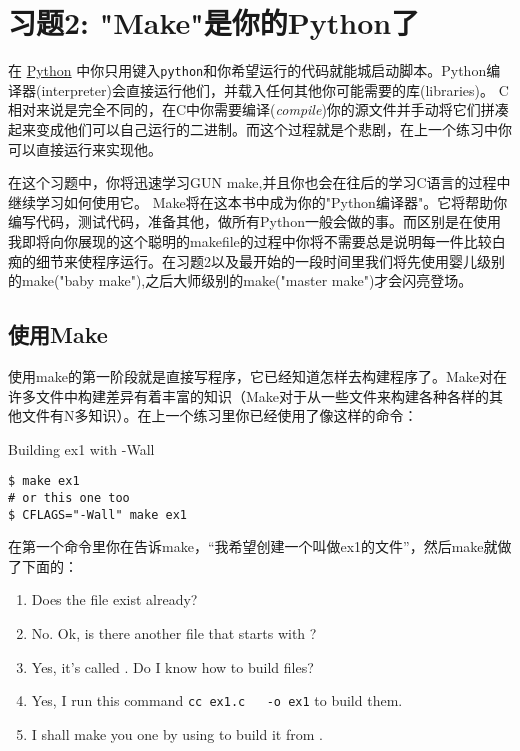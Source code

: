 \chapter{习题2: "Make"是你的Python了}

在 \href{http://learnpythonthehardway.org}{Python} 中你只用键入\verb|python|和你希望运行的代码就能城启动脚本。Python编译器(interpreter)会直接运行他们，并载入任何其他你可能需要的库(libraries)。 C相对来说是完全不同的，在C中你需要编译(\emph{compile})你的源文件并手动将它们拼凑起来变成他们可以自己运行的二进制。而这个过程就是个悲剧，在上一个练习中你可以直接运行来实现他。

在这个习题中，你将迅速学习GUN make,并且你也会在往后的学习C语言的过程中继续学习如何使用它。 Make将在这本书中成为你的"Python编译器"。它将帮助你编写代码，测试代码，准备其他，做所有Python一般会做的事。而区别是在使用我即将向你展现的这个聪明的makefile的过程中你将不需要总是说明每一件比较白痴的细节来使程序运行。在习题2以及最开始的一段时间里我们将先使用婴儿级别的make("baby make"),之后大师级别的make("master make")才会闪亮登场。


\section{使用Make}

使用make的第一阶段就是直接写程序，它已经知道怎样去构建程序了。Make对在许多文件中构建差异有着丰富的知识（Make对于从一些文件来构建各种各样的其他文件有N多知识）。在上一个练习里你已经使用了像这样的命令：

\begin{Terminal}{Building ex1 with -Wall}
\begin{lstlisting}
$ make ex1
# or this one too
$ CFLAGS="-Wall" make ex1
\end{lstlisting}
\end{Terminal}

在第一个命令里你在告诉make，“我希望创建一个叫做ex1的文件”，然后make就做了下面的：

\begin{enumerate}
\item Does the file  exist already?
\item No. Ok, is there another file that starts with ?
\item Yes, it's called . Do I know how to build  files?
\item Yes, I run this command \verb|cc ex1.c   -o ex1| to build them.
\item I shall make you one  by using  to build it from .
\end{enumerate}


